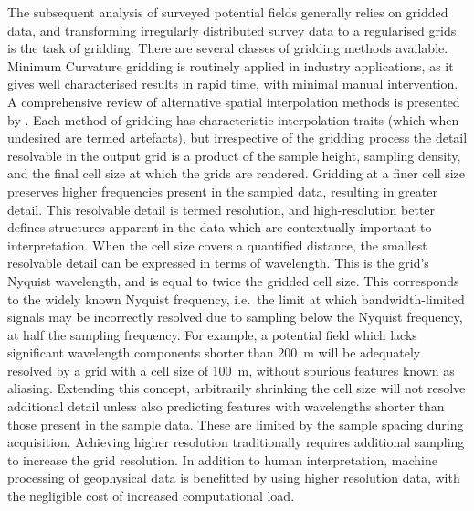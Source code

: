 The subsequent analysis of surveyed potential fields generally relies on gridded data, and transforming irregularly distributed survey data to a regularised grids is the task of gridding.
There are several classes of gridding methods available.
Minimum Curvature gridding \parencite{briggsMachineContouringUsing1974} is routinely applied in industry applications, as it gives well characterised results in rapid time, with minimal manual intervention.
A comprehensive review of alternative spatial interpolation methods is presented by \textcite{liReviewComparativeStudies2011}.
Each method of gridding has characteristic interpolation traits (which when undesired are termed artefacts), but irrespective of the gridding process the detail resolvable in the output grid is a product of the sample height, sampling density, and the final cell size at which the grids are rendered.
Gridding at a finer cell size preserves higher frequencies present in the sampled data, resulting in greater detail.
This resolvable detail is termed resolution, and high-resolution better defines structures apparent in the data which are contextually important to interpretation.
When the cell size covers a quantified distance, the smallest resolvable detail can be expressed in terms of wavelength.
This is the grid's Nyquist wavelength, and is equal to twice the gridded cell size.
This corresponds to the widely known Nyquist frequency, i.e.\ the limit at which bandwidth-limited signals may be incorrectly resolved due to sampling below the Nyquist frequency, at half the sampling frequency.
For example, a potential field which lacks significant wavelength components shorter than \qty{200}{\m} will be adequately resolved by a grid with a cell size of \qty{100}{\m}, without spurious features known as aliasing.
Extending this concept, arbitrarily shrinking the cell size will not resolve additional detail unless also predicting features with wavelengths shorter than those present in the sample data.
These are limited by the sample spacing during acquisition.
Achieving higher resolution traditionally requires additional sampling to increase the grid resolution. %
In addition to human interpretation, machine processing of geophysical data is benefitted by using higher resolution data, with the negligible cost of increased computational load.

